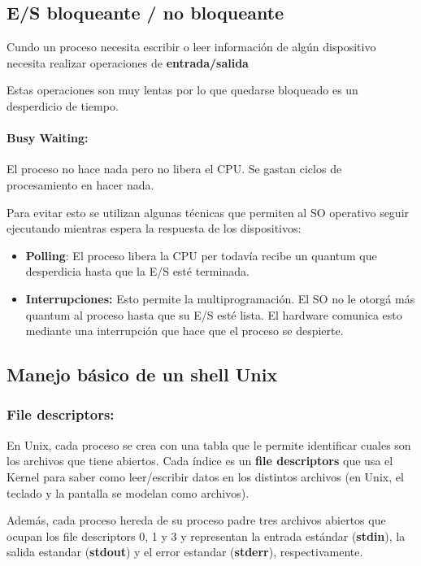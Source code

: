 \subsection{E/S bloqueante / no bloqueante}
	Cundo un proceso necesita escribir o leer información de algún dispositivo necesita realizar operaciones de \textbf{entrada/salida}

	Estas operaciones son muy lentas por lo que quedarse bloqueado es un desperdicio de tiempo.

	\paragraph{Busy Waiting:} El proceso no hace nada pero no libera el CPU. Se gastan ciclos de procesamiento en hacer nada.

	Para evitar esto se utilizan algunas técnicas que permiten al SO operativo seguir ejecutando mientras espera la respuesta de los dispositivos:

	\begin{itemize}
		\item \textbf{Polling}: El proceso libera la CPU per todavía recibe un quantum que desperdicia hasta que la E/S esté terminada.
		\item \textbf{Interrupciones:} Esto permite la multiprogramación. El SO no le otorgá más quantum al proceso hasta que su E/S esté lista. El hardware comunica esto mediante una interrupción que hace que el proceso se despierte.
	\end{itemize}

	\subsection{Manejo básico de un shell Unix}
\subsubsection{File descriptors:}
	En Unix, cada proceso se crea con una tabla que le permite identificar cuales son los archivos que tiene abiertos. Cada índice es un \textbf{file descriptors} que usa el Kernel para saber como leer/escribir datos en los distintos archivos (en Unix, el teclado y la pantalla se modelan como archivos).
	
	Además, cada proceso hereda de su proceso padre tres archivos abiertos que ocupan los file descriptors 0, 1 y 3 y representan la entrada estándar (\textbf{stdin}), la salida estandar (\textbf{stdout}) y el error estandar (\textbf{stderr}), respectivamente.
	
